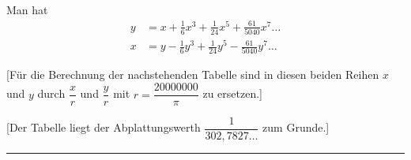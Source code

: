 \documentclass[12pt,a4paper]{article}
\begin{document}
Man hat
\begin{align*}
y &= x + \tfrac{1}{6}x^3 + \tfrac{1}{24}x^5 + \tfrac{61}{5040}x^7\ldots\\
x &= y - \tfrac{1}{6}y^3 + \tfrac{1}{24}y^5 - \tfrac{61}{5040}y^7\ldots
\end{align*}

[Für die Berechnung der nachstehenden Tabelle sind in diesen beiden Reihen $x$ und $y$ durch $\dfrac{x}{r}$ und $\dfrac{y}{r}$ mit $r = \dfrac{20000000}{\pi}$ zu ersetzen.]

[Der Tabelle liegt der Abplattungswerth $\dfrac{1}{302{,}7827\ldots}$ zum Grunde.]

\vfill
\begin{center}
\rule{0.5\textwidth}{0.4pt}
\end{center}
\end{document}
